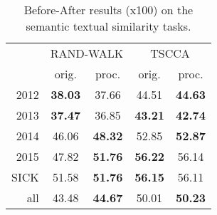 \documentclass{article} \usepackage{acl2017,times}
\begin{document}
\begin{table}[!h]
\centering
\begin{tabular}{|r||c|c||c|c|}
\hline
\multirow{2}{*}{} & \multicolumn{2}{c||}{RAND-WALK} & \multicolumn{2}{c|}{TSCCA} \\ \cline{2-5} 
                  & orig.      & proc.     & orig.    & proc.    \\ \hline
2012 &     \bf 38.03 &      37.66 &  44.51   &  \bf 44.63    \\ \hline
2013 &     \bf 37.47 &      36.85 &  \bf 43.21   & \bf 42.74    \\ \hline
2014 &     46.06 &      \bf 48.32 &  52.85  &  \bf 52.87    \\ \hline
2015 &     47.82 &      \bf 51.76 &   \bf 56.22   &  56.14     \\ \hline
SICK &     51.58 &      \bf  51.76 &  \bf 56.15  &  56.11    \\ \hline
all  &     43.48 &      \bf 44.67 &  50.01   &    \bf 50.23  \\ \hline
\end{tabular}
\caption{Before-After results (x100) on the semantic textual similarity tasks.}
\label{tb:sts-other}
\end{table}
\end{document}
